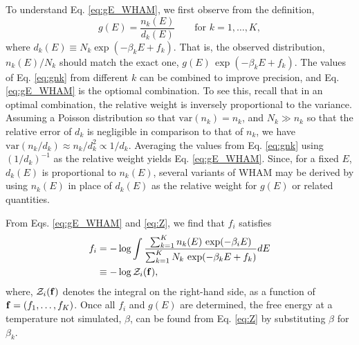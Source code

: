 \documentclass[reprint,aip,jcp,superscriptaddress]{revtex4-1}
\begin{document}
To understand Eq. \eqref{eq:gE_WHAM},
we first observe from the definition,
%
\begin{equation}
g(E)
=
\frac{ n_k(E) }
     { d_k(E) }
\qquad
\mbox{for $k = 1, \dots, K$},
\label{eq:gnk}
\end{equation}
where $d_k(E) \equiv N_k \exp(-\beta_k E + f_k)$.
%
{
That is,
the observed distribution, $n_k(E)/N_k$
should match the exact one, $g(E) \, \exp(-\beta_k E + f_k)$.
%
The values of Eq. \eqref{eq:gnk} from different $k$
can be combined to improve precision,
and Eq. \eqref{eq:gE_WHAM}
is the optiomal combination\cite{
roux1995, souaille2001, newman, frenkel}.
}
%
{
To see this,
recall that in an optimal combination,
}
the relative weight is inversely
proportional to the variance.
%
Assuming a Poisson distribution
so that $\mathrm{var}(n_k) = n_k$,
and $N_k \gg n_k$ so that
the relative error of $d_k$ is negligible
in comparison to that of $n_k$,
we have
$\mathrm{var}(n_k/d_k) \approx n_k / d_k^2 \propto 1/d_k$.
%
Averaging the values from Eq. \eqref{eq:gnk}
using $(1/d_k)^{-1}$ as the relative weight yields
Eq. \eqref{eq:gE_WHAM}.
%
Since, for a fixed $E$,
$d_k(E)$ is proportional to $n_k(E)$,
several variants of WHAM
may be derived
by using $n_k(E)$ in place of $d_k(E)$
as the relative weight for
$g(E)$\cite{
shen1991}
or related quantities\cite{
woolf1994, *crouzy1994, roux1995,
kastner2005, *kastner2009, kim2011}.
%




From Eqs. \eqref{eq:gE_WHAM} and \eqref{eq:Z},
we find that $f_i$ satisfies
%
\begin{align}
f_i
&=
-\log
  \int
    \frac{
      \sum_{k = 1}^K n_k(E) \, \exp(-\beta_i E)
    }
    {
      \sum_{k = 1}^K N_k \, \exp(-\beta_k E + f_k)
    }
    dE
\label{eq:f_WHAM}
\\
&\equiv
-\log \mathcal{Z}_i(\mathbf{f}),
\notag
\end{align}
%
where,
$\mathcal{Z}_i(\mathbf{f})$
denotes the integral on the right-hand side,
as a function of $\mathbf{f} = (f_1, \dots, f_K)$.
%
Once all $f_i$ and $g(E)$ are determined,
the free energy at a temperature not simulated, $\beta$,
can be found from Eq. \eqref{eq:Z}
by substituting $\beta$ for $\beta_k$.
\end{document}
